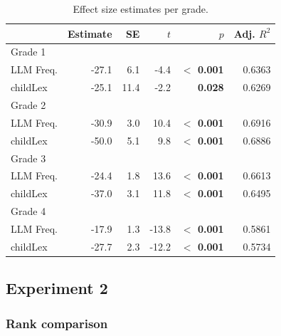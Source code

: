 \documentclass[doc, a4paper]{apa7}
\begin{document}
\begin{table}[!htbp]
\caption{Effect size estimates per grade.}
\centering
\begin{tabular}{lrrrrr}
  \hline
 & Estimate & SE & $t$ & $p$ & Adj. $R^2$   \\ 
  \hline
  Grade 1 \\ 
  LLM Freq. & -27.1 & 6.1 & -4.4 & \textbf{$<$ 0.001} & 0.6363 \\ 
  childLex & -25.1 & 11.4 & -2.2 & \textbf{0.028} & 0.6269\\ 
  Grade 2 \\ 
  LLM Freq. & -30.9 & 3.0 & 10.4 & \textbf{$<$ 0.001} & 0.6916 \\ 
  childLex & -50.0 & 5.1 & 9.8 & \textbf{$<$ 0.001} & 0.6886 \\ 
    Grade 3 \\ 
  LLM Freq. & -24.4 & 1.8 & 13.6 & \textbf{$<$ 0.001} & 0.6613 \\ 
  childLex & -37.0 & 3.1 & 11.8 & \textbf{$<$ 0.001} & 0.6495 \\ 
      Grade 4 \\ 
  LLM Freq. & -17.9 & 1.3 & -13.8 & \textbf{$<$ 0.001} & 0.5861 \\ 
  childLex & -27.7 & 2.3 & -12.2 & \textbf{$<$ 0.001} & 0.5734 \\ 
  \hline
\end{tabular}
\label{effsize}
\end{table}

\clearpage


\subsection{Experiment 2}

\subsubsection{Rank comparison}
\end{document}
